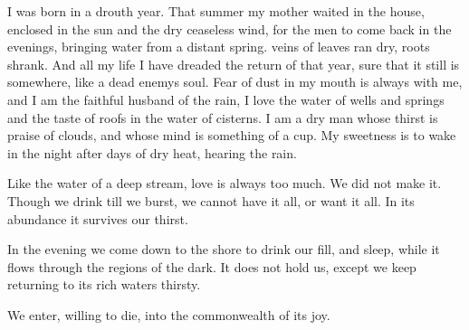 \documentclass[12pt, letterpaper]{report}
\begin{document}
\author{Wendell Berry}

\begin{poem}
\begin{stanza}
I was born in a drouth year. That summer\verseline
my mother waited in the house, enclosed\verseline
in the sun and the dry ceaseless wind,\verseline
for the men to come back in the evenings,\verseline
bringing water from a distant spring.\verseline
veins of leaves ran dry, roots shrank.\verseline
And all my life I have dreaded the return\verseline
of that year, sure that it still is\verseline
somewhere, like a dead enemys soul.\verseline
Fear of dust in my mouth is always with me,\verseline
and I am the faithful husband of the rain,\verseline
I love the water of wells and springs\verseline
and the taste of roofs in the water of cisterns.\verseline
I am a dry man whose thirst is praise\verseline
of clouds, and whose mind is something of a cup.\verseline
My sweetness is to wake in the night\verseline
after days of dry heat, hearing the rain.
\end{stanza}
\end{poem}

\author{Wendell Berry}

\begin{poem}
\begin{stanza}
Like the water\verseline
of a deep stream,\verseline
love is always too much.\verseline
We did not make it.\verseline
Though we drink till we burst,\verseline
we cannot have it all,\verseline
or want it all.\verseline
In its abundance\verseline
it survives our thirst.
\end{stanza}
\begin{stanza}
In the evening we come down to the shore\verseline
to drink our fill,\verseline
and sleep,\verseline
while it flows\verseline
through the regions of the dark.\verseline
It does not hold us,\verseline
except we keep returning to its rich waters\verseline
thirsty.
\end{stanza}
\begin{stanza}
We enter,\verseline
willing to die,\verseline
into the commonwealth of its joy.
\end{stanza}
\end{poem}

\author{Sylvia Plath}
\end{document}

